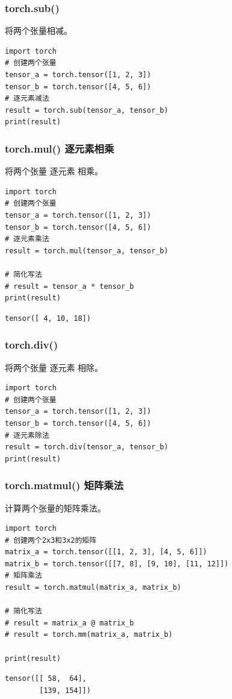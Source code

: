 \subsubsection{torch.sub()}
将两个张量相减。
\begin{lstlisting}[style=pythonstyle]
import torch
# 创建两个张量
tensor_a = torch.tensor([1, 2, 3])
tensor_b = torch.tensor([4, 5, 6])
# 逐元素减法
result = torch.sub(tensor_a, tensor_b)
print(result)
\end{lstlisting}

\subsubsection{torch.mul() 逐元素相乘}
将两个张量 \textcolor{YBXPurple}{逐元素} 相乘。
\begin{lstlisting}[style=pythonstyle]
import torch
# 创建两个张量
tensor_a = torch.tensor([1, 2, 3])
tensor_b = torch.tensor([4, 5, 6])
# 逐元素乘法
result = torch.mul(tensor_a, tensor_b)

# 简化写法
# result = tensor_a * tensor_b
print(result)
\end{lstlisting}
\begin{lstlisting}[style=demostyle,numbers=none]
tensor([ 4, 10, 18])
\end{lstlisting}

\subsubsection{torch.div()}
将两个张量 \textcolor{YBXPurple}{逐元素} 相除。
\begin{lstlisting}[style=pythonstyle]
import torch
# 创建两个张量
tensor_a = torch.tensor([1, 2, 3])
tensor_b = torch.tensor([4, 5, 6])
# 逐元素除法
result = torch.div(tensor_a, tensor_b)
print(result)
\end{lstlisting}

\subsubsection{torch.matmul() 矩阵乘法}
计算两个张量的矩阵乘法。
\begin{lstlisting}[style=pythonstyle]
import torch
# 创建两个2x3和3x2的矩阵
matrix_a = torch.tensor([[1, 2, 3], [4, 5, 6]])
matrix_b = torch.tensor([[7, 8], [9, 10], [11, 12]])
# 矩阵乘法
result = torch.matmul(matrix_a, matrix_b)

# 简化写法
# result = matrix_a @ matrix_b
# result = torch.mm(matrix_a, matrix_b)

print(result)
\end{lstlisting}
\begin{lstlisting}[style=demostyle,numbers=none]
tensor([[ 58,  64],
        [139, 154]])
\end{lstlisting}

